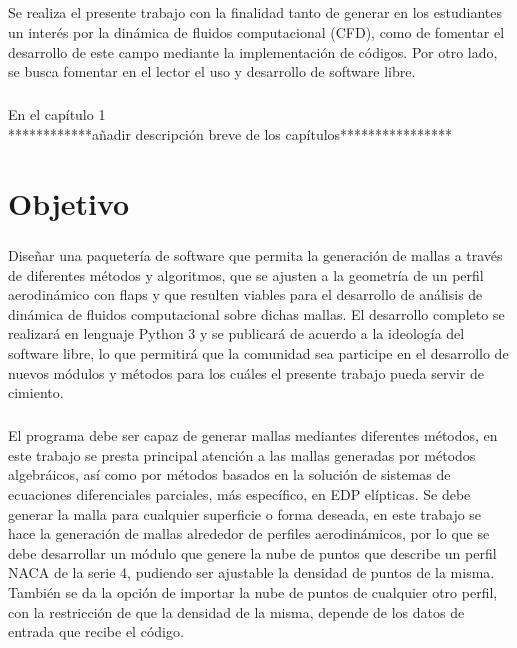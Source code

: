 \documentclass[letterpaper, openright, 12pt]{book}
\begin{document}
	\paragraph*{}
	Se realiza el presente trabajo con la finalidad tanto de generar en los
    estudiantes un interés por la dinámica de fluidos computacional (CFD), como
    de fomentar el desarrollo de este campo mediante la implementación de
    códigos. Por otro lado, se busca fomentar en el lector el uso y desarrollo
    de software libre.

	\paragraph*{}
	En el capítulo 1\\************añadir descripción breve de los capítulos****************




	\chapter*{Objetivo}

    \paragraph*{}
    Diseñar una paquetería de software que permita la generación de mallas a
    través de diferentes métodos y algoritmos, que se ajusten a la geometría de
    un perfil aerodinámico con flaps y que resulten viables para el desarrollo
    de análisis  de dinámica de fluidos computacional sobre dichas mallas.
    El desarrollo completo se realizará en lenguaje Python 3 y se publicará de
    acuerdo a la ideología del software libre, lo que permitirá que la comunidad
    sea participe en el desarrollo de nuevos módulos y métodos para los cuáles
    el presente trabajo pueda servir de cimiento.

    \paragraph*{}
    El programa debe ser capaz de generar  mallas mediantes diferentes
    métodos, en este trabajo se presta principal atención a las mallas
    generadas por métodos algebráicos, así como por métodos basados en la
    solución de sistemas de ecuaciones diferenciales parciales,
    más específico, en EDP elípticas. Se debe generar la malla para
    cualquier superficie o forma deseada, en este trabajo se hace la
    generación de mallas alrededor de perfiles aerodinámicos, por lo que se
    debe desarrollar un módulo que genere la nube de puntos que describe un
    perfil NACA de la serie 4, pudiendo ser ajustable la densidad de puntos
    de la misma. También se da la opción de importar la nube de puntos de
    cualquier otro perfil, con la restricción de que la densidad de la
    misma, depende de los datos de entrada que recibe el código.
\end{document}
